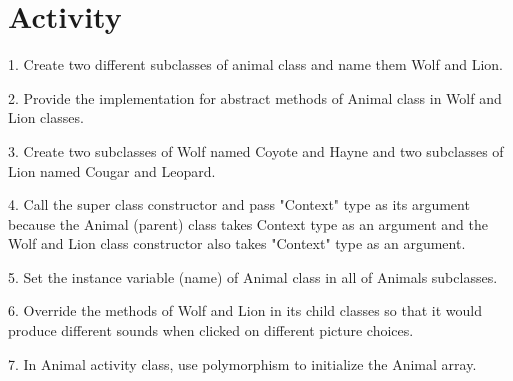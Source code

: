 \section{Activity}
\begin{flushleft}
1. Create two different subclasses of animal class and name them Wolf and Lion.

2. Provide the implementation for abstract methods of Animal class in Wolf and Lion classes.

3. Create two subclasses of Wolf named Coyote and Hayne and two subclasses of Lion named Cougar and Leopard.

4. Call the super class constructor and pass "Context" type as its argument because the Animal (parent) class takes Context type as an argument and the  Wolf and Lion class constructor also takes "Context" type as an argument.

5. Set the instance variable (name) of Animal class in all of Animals subclasses.

6. Override the methods of Wolf and Lion in its child classes so that it would produce different sounds when clicked on different picture choices.

7. In Animal activity class, use polymorphism to initialize the Animal array.
\end{flushleft}

